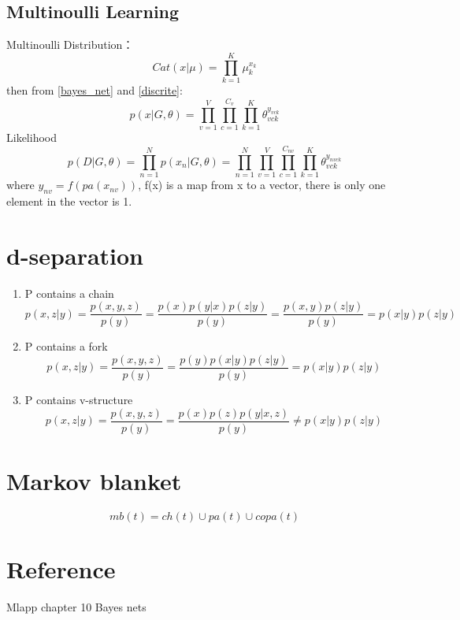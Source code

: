 \subsection{Multinoulli Learning}
Multinoulli Distribution：
\begin{equation}
Cat(x|\mu) = \prod_{k=1}^K\mu_k^{x_k}
\label{discrite}
\end{equation}
then from \ref{bayes_net} and \ref{discrite}:
\begin{equation}
p(x|G,\theta) = \prod_{v=1}^V\prod_{c=1}^{C_v}\prod_{k=1}^K
\theta_{vck}^{y_{vck}}
\end{equation}
Likelihood
\begin{equation}
p(D|G,\theta) = \prod_{n=1}^N p(x_n|G,\theta)
=\prod_{n=1}^N\prod_{v=1}^V\prod_{c=1}^{C_{nv}}\prod_{k=1}^K
\theta_{vck}^{y_{nvck}}
\end{equation}
where $y_{nv} = f(pa(x_{nv}))$, f(x) is a map from x to a vector,
there is only one element in the vector is 1.

\section{d-separation}
\begin{enumerate}
\item P contains a chain
\begin{equation}
p(x,z|y) = \frac{p(x,y,z)}{p(y)}
= \frac{p(x)p(y|x)p(z|y)}{p(y)}
= \frac{p(x,y)p(z|y)}{p(y)} = p(x|y)p(z|y)
\end{equation}

\item P contains a fork
\begin{equation}
p(x,z|y) = \frac{p(x,y,z)}{p(y)}
= \frac{p(y)p(x|y)p(z|y)}{p(y)}
= p(x|y)p(z|y)
\end{equation}
\item P contains v-structure
\begin{equation}
p(x,z|y) = \frac{p(x,y,z)}{p(y)}
= \frac{p(x)p(z)p(y|x,z)}{p(y)}
\neq p(x|y)p(z|y)
\end{equation}
\end{enumerate}
\section{Markov blanket}
\begin{equation}
mb(t) = ch(t)\cup pa(t)\cup copa(t)
\end{equation}

\section{Reference}
Mlapp chapter 10 Bayes nets
